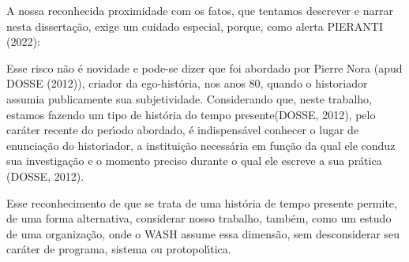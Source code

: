 \documentclass[
12pt,		%
openright,	%
twoside,  %
a4paper,			%
chapter=TITLE,		%
english,			%
french,				%
spanish,			%
brazil				%
]{USPSC-classe/USPSC}
\begin{document}
A nossa reconhecida proximidade com os fatos, que tentamos descrever e narrar nesta disserta\c{c}\~ao, exige um cuidado especial, porque, como alerta  PIERANTI (2022):


















\noindent\begin{center}\mbox{\centering{}}\end{center}


Esse risco n\~ao \'e novidade e pode-se dizer que foi abordado por Pierre Nora  (apud DOSSE (2012)), criador da ego-hist\'oria, nos anos 80, quando o historiador assumia publicamente sua subjetividade. Considerando que, neste trabalho, estamos fazendo um tipo de \textquotedbl hist\'oria do tempo presente\textquotedbl   (DOSSE, 2012), pelo car\'ater recente do per\'{\i}odo abordado, \'e indispens\'avel \textquotedbl conhecer o lugar de enuncia\c{c}\~ao do historiador, a institui\c{c}\~ao necess\'aria em fun\c{c}\~ao da qual ele conduz sua investiga\c{c}\~ao e o momento preciso durante o qual ele escreve a sua pr\'atica \textquotedbl   (DOSSE, 2012).

















Esse reconhecimento de que se trata de uma hist\'oria de tempo presente permite, de uma forma alternativa, considerar nosso trabalho, tamb\'em, como um estudo de uma organiza\c{c}\~ao, onde o WASH assume essa dimens\~ao, sem desconsiderar seu car\'ater de  programa, sistema ou protopol\'{\i}tica.
\end{document}
